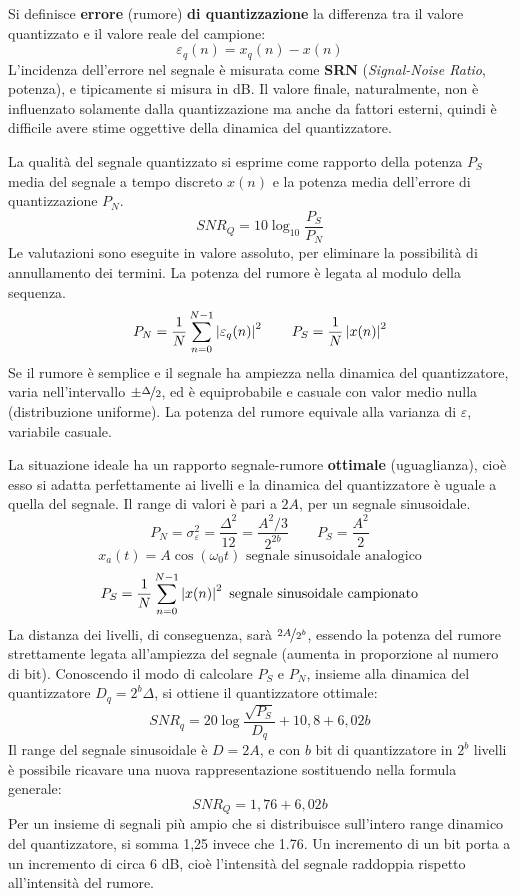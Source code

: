 Si definisce \textbf{errore} (rumore) \textbf{di quantizzazione} la differenza tra il valore quantizzato e il valore reale del campione:
$$\varepsilon_q(n) = x_q(n) - x(n)$$
L'incidenza dell'errore nel segnale è misurata come \textbf{SRN} (\textit{Signal-Noise Ratio}, potenza), e tipicamente si misura in dB. Il valore finale, naturalmente, non è influenzato solamente dalla quantizzazione ma anche da fattori esterni, quindi è difficile avere stime oggettive della dinamica del quantizzatore.

La qualità del segnale quantizzato si esprime come rapporto della potenza $P_S$ media del segnale a tempo discreto $x(n)$ e la potenza media dell'errore di quantizzazione $P_N$.
$$SNR_Q = 10\log_{10}\frac{P_S}{P_N}$$
Le valutazioni sono eseguite in valore assoluto, per eliminare la possibilità di annullamento dei termini. La potenza del rumore è legata al modulo della sequenza. 
$$P_N = \frac{1}{N}\sum_{n=0}^{N-1}\left|\varepsilon_q(n)\right|^2 \qquad P_S = \frac{1}{N}\left|x(n)\right|^2$$
Se il rumore è semplice e il segnale ha ampiezza nella dinamica del quantizzatore, varia nell'intervallo $\pm \nicefrac{\Delta}{2}$, ed è equiprobabile e casuale con valor medio nulla (distribuzione uniforme). La potenza del rumore equivale alla varianza di $\varepsilon$, variabile casuale.

La situazione ideale ha un rapporto segnale-rumore \textbf{ottimale} (uguaglianza), cioè esso si adatta perfettamente ai livelli e la dinamica del quantizzatore è uguale a quella del segnale. Il range di valori è pari a $2A$, per un segnale sinusoidale.
$$P_N = \sigma^2_\varepsilon = \frac{\Delta^2}{12} = \frac{A^2/3}{2^{2b}} \qquad P_S = \frac{A^2}{2}$$
$$x_a(t) = A\cos(\omega_0t) \text{ segnale sinusoidale analogico}$$
$$P_S = \frac{1}{N} \sum_{n=0}^{N-1}\left|x(n)\right|^2 \text{ segnale sinusoidale campionato}$$
La distanza dei livelli, di conseguenza, sarà $\nicefrac{2A}{2^b}$, essendo la potenza del rumore strettamente legata all'ampiezza del segnale (aumenta in proporzione al numero di bit). Conoscendo il modo di calcolare $P_S$ e $P_N$, insieme alla dinamica del quantizzatore $D_q = 2^b\Delta$, si ottiene il quantizzatore ottimale:
$$SNR_q = 20\log\frac{\sqrt{P_S}}{D_q} + 10,8 + 6,02b$$
Il range del segnale sinusoidale è $D = 2A$, e con $b$ bit di quantizzatore in $2^b$ livelli è possibile ricavare una nuova rappresentazione sostituendo nella formula generale:
$$SNR_Q = 1,76 + 6,02b$$
Per un insieme di segnali più ampio che si distribuisce sull'intero range dinamico del quantizzatore, si somma 1,25 invece che 1.76. Un incremento di un bit porta a un incremento di circa 6 dB, cioè l'intensità del segnale raddoppia rispetto all'intensità del rumore.

